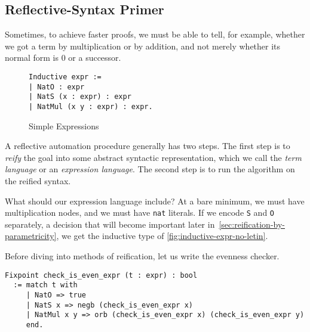 \subsection{Reflective-Syntax Primer}
Sometimes, to achieve faster proofs, we must be able to tell, for example, whether we got a term by multiplication or by addition, and not merely whether its normal form is 0 or a successor.%

\begin{wrapfigure}[4]{r}{0pt}
\begin{verbatim}
Inductive expr :=
| NatO : expr
| NatS (x : expr) : expr
| NatMul (x y : expr) : expr.
\end{verbatim}
\caption{Simple Expressions}\label{fig:inductive-expr-no-letin}
\end{wrapfigure}

A reflective automation procedure generally has two steps.
The first step is to \emph{reify} the goal into some abstract syntactic representation, which we call the \emph{term language} or an \emph{expression language}.
The second step is to run the algorithm on the reified syntax.

What should our expression language include?
At a bare minimum, we must have multiplication nodes, and we must have \texttt{nat} literals.
If we encode \texttt{S} and \texttt{O} separately, a decision that will become important later in~\autoref{sec:reification-by-parametricity}, we get the inductive type of \autoref{fig:inductive-expr-no-letin}.

Before diving into methods of reification, let us write the evenness checker.
\begin{verbatim}
Fixpoint check_is_even_expr (t : expr) : bool
  := match t with
     | NatO => true
     | NatS x => negb (check_is_even_expr x)
     | NatMul x y => orb (check_is_even_expr x) (check_is_even_expr y)
     end.
\end{verbatim}

